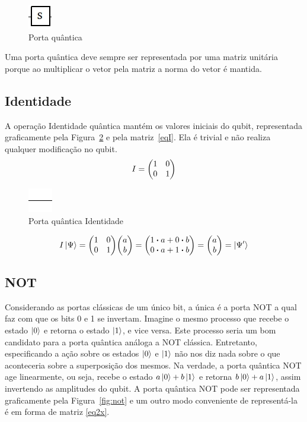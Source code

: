 \documentclass[a4paper, 12pt, oneside]{book}
\begin{document}
\begin{figure}[H]
\centering
\includegraphics[scale=0.75]{s.jpg}
\caption{Porta quântica}
\label{fig:portaQuantica}
\end{figure}

Uma porta quântica deve sempre ser representada por uma matriz unitária porque ao multiplicar o vetor pela matriz a norma do vetor é mantida.

\subsection{Identidade} \label{sec:identidade}
A operação Identidade quântica mantém os valores iniciais do qubit, representada graficamente pela Figura~\ref{fig:I} e pela matriz~\eqref{eqI}. Ela é trivial e não realiza qualquer modificação no qubit.
\begin{equation}\label{eqI}
I =  \mqty(1&0\\0&1)
\end{equation}

\begin{figure}[H]
\centering
\includegraphics[scale=0.75]{line.jpg}
\caption{Porta quântica Identidade}
\label{fig:I}
\end{figure}

\begin{align*}
I\ket{\Psi} = \mqty(1&0\\0&1)\mqty(a\\b) = \mqty(1 \vdot a+0 \vdot b \\0 \vdot a+1 \vdot b) = \mqty(a\\b) = \ket{\Psi'}
\end{align*}

\subsection{NOT} 
Considerando as portas clássicas de um único bit, a única é a porta NOT a qual faz com que os bits 0 e 1 se invertam. Imagine o mesmo processo que recebe o estado $\ket{0}$ e retorna o estado $\ket{1}$, e vice versa. Este processo seria um bom candidato para a porta quântica análoga a NOT clássica. Entretanto, especificando a ação sobre os estados $\ket{0}$ e $\ket{1}$ não nos diz nada sobre o que aconteceria sobre a superposição dos mesmos. Na verdade, a porta quântica NOT age linearmente, ou seja, recebe o estado $a\ket{0} + b\ket{1}$ e retorna $b\ket{0} + a\ket{1}$, assim invertendo as amplitudes do qubit. A porta quântica NOT pode ser representada graficamente pela Figura~\ref{fig:not} e um outro modo conveniente de representá-la é em forma de matriz \eqref{eq2x}.
\end{document}
